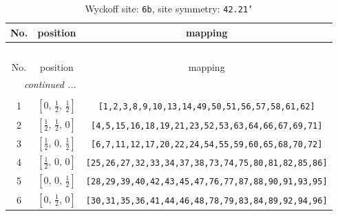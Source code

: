 \documentclass[fleqn,8pt]{jsarticle}
\begin{document}
\begin{longtable}{ccc}
\caption{Wyckoff site: {\tt 6b}, site symmetry: {\tt 42.21'}}
 \\
 \hline \hline
No. & position & mapping \\ \hline \endfirsthead

\multicolumn{2}{l}{\tablename\ \thetable{}} \\
 \hline \hline
No. & position & mapping \\ \hline \endhead

 \hline \hline
\multicolumn{2}{r}{\footnotesize\it continued ...} \\ \endfoot

 \hline \hline
\multicolumn{2}{r}{} \\ \endlastfoot

1 & $\left[ 0,\, \frac{1}{2},\, \frac{1}{2} \right]$ & {\tt [1,2,3,8,9,10,13,14,49,50,51,56,57,58,61,62]} \\ \hline
2 & $\left[ \frac{1}{2},\, \frac{1}{2},\, 0 \right]$ & {\tt [4,5,15,16,18,19,21,23,52,53,63,64,66,67,69,71]} \\ \hline
3 & $\left[ \frac{1}{2},\, 0,\, \frac{1}{2} \right]$ & {\tt [6,7,11,12,17,20,22,24,54,55,59,60,65,68,70,72]} \\ \hline
4 & $\left[ \frac{1}{2},\, 0,\, 0 \right]$ & {\tt [25,26,27,32,33,34,37,38,73,74,75,80,81,82,85,86]} \\ \hline
5 & $\left[ 0,\, 0,\, \frac{1}{2} \right]$ & {\tt [28,29,39,40,42,43,45,47,76,77,87,88,90,91,93,95]} \\ \hline
6 & $\left[ 0,\, \frac{1}{2},\, 0 \right]$ & {\tt [30,31,35,36,41,44,46,48,78,79,83,84,89,92,94,96]} \\
\end{longtable}
\renewcommand{\arraystretch}{1.2}
\end{document}

